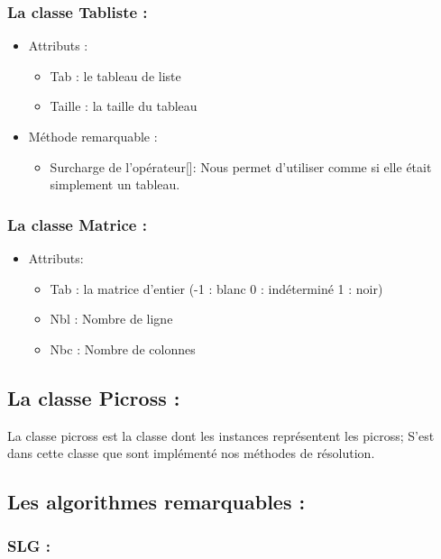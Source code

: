 \documentclass{article}
\begin{document}
\subsubsection{La classe Tabliste :}
\begin{itemize}
\item Attributs :
\begin{itemize}
\item Tab : le tableau de liste
\item Taille : la taille du tableau
\end{itemize}
\item M\'ethode remarquable :
\begin{itemize}
\item Surcharge de l'op\'erateur[]: Nous permet d'utiliser comme si elle \'etait simplement un tableau.
\end{itemize}
\end{itemize}
\subsubsection{La classe Matrice :}
\begin{itemize}
\item Attributs:
\begin{itemize}
\item Tab : la matrice d'entier (-1 : blanc 0 : ind\'etermin\'e 1 : noir)
\item Nbl : Nombre de ligne
\item Nbc : Nombre de colonnes
\end{itemize}
\end{itemize}
\subsection{ La classe Picross :}
La classe picross est la classe dont les instances repr\'esentent les picross; S'est dans cette classe que sont impl\'ement\'e nos m\'ethodes de r\'esolution.
\subsection{Les algorithmes remarquables :}
\subsubsection{SLG :}
\end{document}
